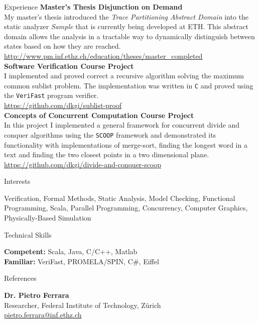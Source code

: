 \documentclass[margin]{res}
\begin{document}
\begin{resume}
\begin{section}{Experience}
		\textbf{Master's Thesis Disjunction on Demand}\\
		My master's thesis introduced the \emph{Trace Partitioning Abstract Domain} into the static analyzer \emph{Sample} that is currently being developed at ETH. This abstract domain allows the analysis in a tractable way to dynamically distinguish between states based on how they are reached.\\
		\url{http://www.pm.inf.ethz.ch/education/theses/master_completed}\\[12pt]
		\textbf{Software Verification Course Project}\\
		I implemented and proved correct a recursive algorithm solving the maximum common sublist problem. The implementation was written in \texttt{C} and proved using the \texttt{VeriFast} program verifier.\\[2pt]
		\url{https://github.com/dkgi/sublist-proof}\\[12pt]
		\textbf{Concepts of Concurrent Computation Course Project}\\
		In this project I implemented a general framework for concurrent divide and conquer algorithms using the \texttt{SCOOP} framework and demonstrated its functionality with implementations of merge-sort, finding the longest word in a text and finding the two closest points in a two dimensional plane.\\[2pt]
		\url{https://github.com/dkgi/divide-and-conquer-scoop}

	\end{section}


	\begin{section}{Interests}

		Verification, Formal Methods, Static Analysis, Model Checking, Functional Programming, Scala,
		Parallel Programming, Concurrency, Computer Graphics, Physically-Based Simulation

	\end{section}


	\begin{section}{Technical Skills}

		\textbf{Competent:} Scala, Java, C/C++, Matlab\\
		\textbf{Familiar:} VeriFast, PROMELA/SPIN, C\#, Eiffel

	\end{section}


	\begin{section}{References}

		\textbf{Dr. Pietro Ferrara}\\ 
		Researcher, Federal Institute of Technology, Z\"urich\\[2pt]
		\url{pietro.ferrara@inf.ethz.ch}\\

	\end{section}

\end{resume} 
\end{document}
